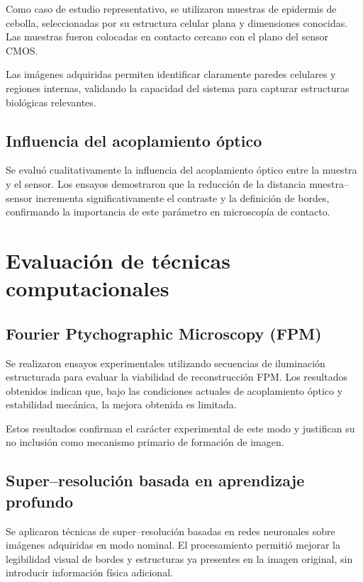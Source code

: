 Como caso de estudio representativo, se utilizaron muestras de epidermis de
cebolla, seleccionadas por su estructura celular plana y dimensiones conocidas.
Las muestras fueron colocadas en contacto cercano con el plano del sensor CMOS.

Las imágenes adquiridas permiten identificar claramente paredes celulares y
regiones internas, validando la capacidad del sistema para capturar estructuras
biológicas relevantes.

\subsection{Influencia del acoplamiento óptico}

Se evaluó cualitativamente la influencia del acoplamiento óptico entre la muestra
y el sensor. Los ensayos demostraron que la reducción de la distancia
muestra--sensor incrementa significativamente el contraste y la definición de
bordes, confirmando la importancia de este parámetro en microscopía de contacto.

\section{Evaluación de técnicas computacionales}

\subsection{Fourier Ptychographic Microscopy (FPM)}

Se realizaron ensayos experimentales utilizando secuencias de iluminación
estructurada para evaluar la viabilidad de reconstrucción FPM. Los resultados
obtenidos indican que, bajo las condiciones actuales de acoplamiento óptico y
estabilidad mecánica, la mejora obtenida es limitada.

Estos resultados confirman el carácter experimental de este modo y justifican su
no inclusión como mecanismo primario de formación de imagen.

\subsection{Super--resolución basada en aprendizaje profundo}

Se aplicaron técnicas de super--resolución basadas en redes neuronales sobre
imágenes adquiridas en modo nominal. El procesamiento permitió mejorar la
legibilidad visual de bordes y estructuras ya presentes en la imagen original,
sin introducir información física adicional.

